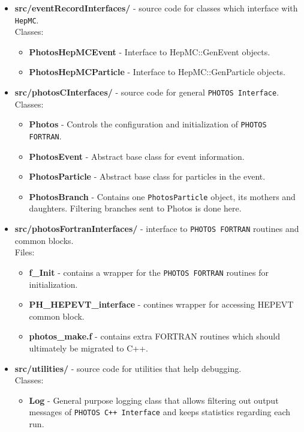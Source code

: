 \documentclass[]{Photos_interface_design}
\begin{document}
\begin{itemize}
\item {\bf src/eventRecordInterfaces/ } - source code for classes which interface with {\tt HepMC}.\\
  Classes:
  \begin{itemize}S
  \item { \bf PhotosHepMCEvent} - Interface to HepMC::GenEvent objects. 
  \item { \bf PhotosHepMCParticle} - Interface to HepMC::GenParticle objects. 
  \end{itemize}   

\item {\bf src/photosCInterfaces/ } - source code for general {\tt PHOTOS Interface}.  \\
  Classes:
  \begin{itemize}
  \item { \bf Photos } - Controls the configuration and initialization of {\tt PHOTOS FORTRAN}.
  \item { \bf PhotosEvent } - Abstract base class for event information.
  \item { \bf PhotosParticle } - Abstract base class for particles in the event.
  \item { \bf PhotosBranch } - Contains one {\tt PhotosParticle} object, its mothers and daughters.
  Filtering branches sent to Photos is done here.
  \end{itemize}

\item {\bf src/photosFortranInterfaces/ } -  interface to {\tt PHOTOS FORTRAN} routines and common blocks. \\
  Files:
    \begin{itemize}
    \item { \bf f\_Init } - contains a wrapper for the {\tt PHOTOS FORTRAN} routines for initialization.
    \item { \bf PH\_HEPEVT\_interface } - contines wrapper for accessing HEPEVT common block.
    \item { \bf photos\_make.f } - contains extra FORTRAN routines which should ultimately be migrated to C++.
    \end{itemize}

\item {\bf src/utilities/ } - source code for utilities that help debugging.\\
  Classes:
  \begin{itemize}
  \item { \bf Log} - General purpose logging class that allows filtering out output messages 
      of {\tt PHOTOS C++ Interface} and keeps statistics regarding each run.
  \end{itemize}   


\end{itemize}
\end{document}
